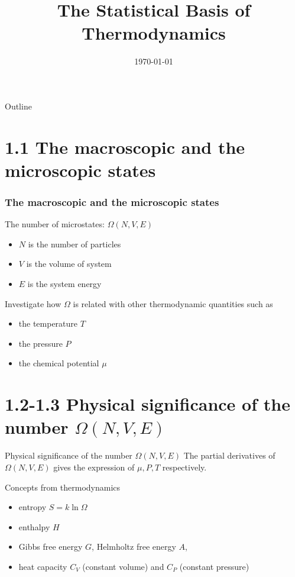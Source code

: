 \documentclass{beamer}
\title{The Statistical Basis of Thermodynamics}
\date{\today}
\begin{document}
\begin{frame}
	\titlepage
\end{frame}
\begin{frame}{Outline}
    \tableofcontents
\end{frame}
\section{1.1 The macroscopic and the microscopic states}

\begin{frame}
\frametitle{The macroscopic and the microscopic states}
\begin{block}{The number of microstates: $\Omega(N,V,E)$}
\begin{itemize}
    \item $N$ is the number of particles
    \item $V$ is the volume of system
    \item $E$ is the system energy
\end{itemize}
\end{block}
\begin{block}{Investigate how $\Omega$ is related with other thermodynamic quantities}
    such as
\begin{itemize}
    \item the temperature $T$
    \item the pressure $P$
    \item the chemical potential $\mu$
\end{itemize}
\end{block}

\end{frame}
\section{1.2-1.3 Physical significance of the number $\Omega(N,V,E)$}
\begin{frame}{Physical significance of the number $\Omega(N,V,E)$}
    The partial derivatives of $\Omega(N,V,E)$ gives the expression of $\mu, P, T$
    respectively.
    \begin{block}
    {Concepts from thermodynamics}
    \begin{itemize}
        \item entropy $S=k\ln \Omega$
    \item enthalpy $H$
    \item Gibbs free energy $G$, Helmholtz free energy $A$,
    \item heat capacity $C_V$ (constant volume) and $C_P$ (constant pressure)
    \end{itemize}
    \end{block}
\end{frame}
\end{document}

